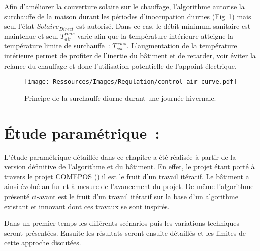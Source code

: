 Afin d’améliorer la couverture solaire sur le chauffage, l’algorithme autorise la
surchauffe de la maison durant les périodes d’inoccupation diurnes
(Fig~\ref{fig:control_air}) mais seul l’état $Solaire_{Direct}$ est autorisé. Dans ce
cas, le débit minimum sanitaire est maintenue et seul $T_{air}^{cons}$ varie afin que la
température intérieure atteigne la température limite de surchauffe~: $T^{cons}_{sol}$.
L’augmentation de la température intérieure permet de profiter de l’inertie du bâtiment et
de retarder, voir éviter la relance du chauffage et donc l’utilisation potentielle de
l’appoint électrique.
\begin{figure}
    \begin{center}
        \texttt{[image: Ressources/Images/Regulation/control\_air\_curve.pdf]}
    \end{center}
    \caption{Principe de la surchauffe diurne durant une journée hivernale.
             \label{fig:control_air}}
\end{figure}








\section{Étude paramétrique~:} %
\label{sec:etude_parametrique_}
L’étude paramétrique détaillée dans ce chapitre a été réalisée à partir de la
version définitive de l’algorithme et du bâtiment. En effet, le projet étant
porté à travers le projet COMEPOS ()
il est le fruit d’un travail itératif. Le bâtiment a ainsi évolué au fur et à mesure
de l’avancement du projet. De même l’algorithme présenté ci-avant est le fruit d’un
travail itératif sur la base d’un algorithme existant et innovant dont
ces travaux se sont inspirés.

Dans un premier temps les différents scénarios puis les variations techniques
seront présentées. Ensuite les résultats seront ensuite détaillés et les limites
de cette approche discutées.


